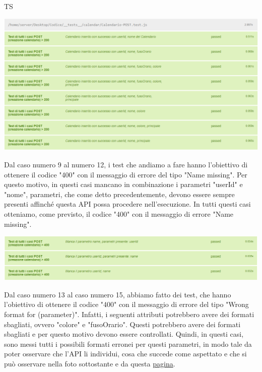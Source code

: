 \begin{listaPersonale}{TS}
                \begin{center}
                        \includegraphics[width=1\textwidth, height=0.42\textheight]{img/png/tests/CalendarioPost/200_postCalendario.png}
                \end{center}
                Dal caso numero 9 al numero 12, i test che andiamo a fare hanno l'obiettivo di ottenere il codice "400" con il messaggio di errore del tipo "Name missing". Per questo motivo, in questi casi mancano in combinazione i parametri "userId" e "nome", parametri, che come detto precedentemente, devono essere sempre presenti affinché questa API possa procedere nell'esecuzione. In tutti questi casi otteniamo, come previsto, il codice "400" con il messaggio di errore "Name missing".
                \begin{center}
                        \includegraphics[width=1\textwidth, height=0.13\textheight]{img/png/tests/CalendarioPost/400_missingParameter_PostCalendario.png}
                \end{center}
                Dal caso numero 13 al caso numero 15, abbiamo fatto dei test, che hanno l'obiettivo di ottenere il codice "400" con il messaggio di errore del tipo "Wrong format for (parameter)". Infatti, i seguenti attributi potrebbero avere dei formati sbagliati, ovvero "colore" e "fusoOrario". Questi potrebbero avere dei formati sbagliati e per questo motivo devono essere controllati. Quindi, in questi casi, sono messi tutti i possibili formati erronei per questi parametri, in modo tale da poter osservare che l'API li individui, cosa che succede come aspettato e che si può osservare nella foto sottostante e da questa \href{https://plan-it.it/test-report.html} {pagina}.

\end{listaPersonale}
